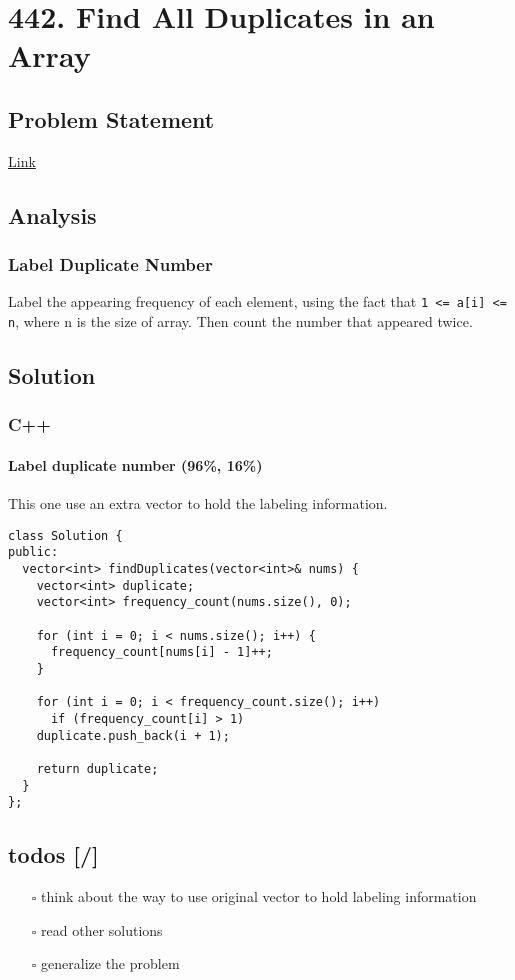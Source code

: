 \documentclass[11pt]{article}
\begin{document}
\section{442. Find All Duplicates in an Array\label{org4c4ef04}}
\label{sec:org107081a}
\subsection{Problem Statement}
\label{sec:org5d5b76d}
\href{https://leetcode.com/problems/find-all-duplicates-in-an-array/}{Link}
\subsection{Analysis}
\label{sec:orgea479e9}
\subsubsection{Label Duplicate Number}
\label{sec:org0f80330}
Label the appearing frequency of each element, using the fact that \texttt{1 <= a[i] <= n}, where n is the size of array. Then count the number that appeared twice.
\subsection{Solution}
\label{sec:orgdab5cb5}
\subsubsection{C++}
\label{sec:orga8cfd36}
\paragraph{Label duplicate number (96\%, 16\%)}
\label{sec:org78e409d}
This one use an extra vector to hold the labeling information.
\begin{verbatim}
class Solution {
public:
  vector<int> findDuplicates(vector<int>& nums) {
    vector<int> duplicate;
    vector<int> frequency_count(nums.size(), 0);

    for (int i = 0; i < nums.size(); i++) {
      frequency_count[nums[i] - 1]++;
    }

    for (int i = 0; i < frequency_count.size(); i++)
      if (frequency_count[i] > 1)
	duplicate.push_back(i + 1);

    return duplicate;
  }
};
\end{verbatim}

\subsection{todos [/]}
\label{sec:org8c3eaf5}
\begin{itemize}
\item[{$\square$}] think about the way to use original vector to hold labeling information
\item[{$\square$}] read other solutions
\item[{$\square$}] generalize the problem
\end{itemize}
\end{document}
